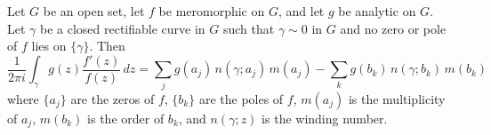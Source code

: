 Let $G$ be an open set, let $f$ be meromorphic on $G$, and let $g$ be analytic on $G$. Let $\gamma$ be a closed rectifiable curve in $G$ such that $\gamma \sim 0$ in $G$ and no zero or pole of $f$ lies on $\{\gamma\}$. Then
$$
\frac{1}{2\pi i} \int_{\gamma} g(z) \frac{f'(z)}{f(z)}\,dz = \sum_{j} g(a_j)\, n(\gamma; a_j)\, m(a_j) - \sum_{k} g(b_k)\, n(\gamma; b_k)\, m(b_k)
$$
where $\{a_j\}$ are the zeros of $f$, $\{b_k\}$ are the poles of $f$, $m(a_j)$ is the multiplicity of $a_j$, $m(b_k)$ is the order of $b_k$, and $n(\gamma; z)$ is the winding number.
